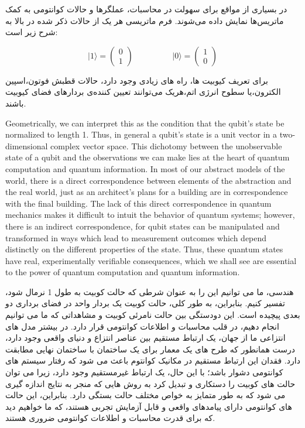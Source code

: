 \documentclass{book}
\begin{document}
در بسیاری از مواقع برای سهولت در محاسبات، عملگر‌ها و حالات کوانتومی به کمک ماتریس‌ها نمایش داده ‌می‌شوند. فرم ماتریسی هر یک از حالات ذکر شده در بالا به شرح زیر است:

\begin{equation}
	\vert 1 \rangle = \begin{pmatrix} 0 \\ 1 \end{pmatrix}
	\hspace{2cm}
	\vert 0 \rangle = \begin{pmatrix} 1 \\ 0 \end{pmatrix}	
\end{equation}

برای تعریف کیوبیت ها، راه های زیادی وجود دارد، حالات قطبش فوتون،‌اسپین الکترون،‌یا سطوح انرژی اتم،‌هریک می‌توانند تعیین کننده‌ی بردار‌های فضای کیوبیت باشند.




Geometrically, we can interpret
this as the condition that the qubit’s state be normalized to length 1. Thus, in general a
qubit’s state is a unit vector in a two-dimensional complex vector space.
This dichotomy between the unobservable state of a qubit and the observations we
can make lies at the heart of quantum computation and quantum information. In most
of our abstract models of the world, there is a direct correspondence between elements
of the abstraction and the real world, just as an architect’s plans for a building are in
correspondence with the final building. The lack of this direct correspondence in quantum
mechanics makes it difficult to intuit the behavior of quantum systems; however, there
is an indirect correspondence, for qubit states can be manipulated and transformed in
ways which lead to measurement outcomes which depend distinctly on the different
properties of the state. Thus, these quantum states have real, experimentally verifiable
consequences, which we shall see are essential to the power of quantum computation and
quantum information.

هندسی، ما می توانیم این را به عنوان شرطی که حالت کوبیت به طول 1 نرمال شود، تفسیر کنیم. بنابراین، به طور کلی، حالت کوبیت یک بردار واحد در فضای برداری دو بعدی پیچیده است.
این دودستگی بین حالت نامرئی کوبیت و مشاهداتی که ما می توانیم انجام دهیم، در قلب محاسبات و اطلاعات کوانتومی قرار دارد. در بیشتر مدل های انتزاعی ما از جهان، یک ارتباط مستقیم بین عناصر انتزاع و دنیای واقعی وجود دارد، درست همانطور که طرح های یک معمار برای یک ساختمان با ساختمان نهایی مطابقت دارد. فقدان این ارتباط مستقیم در مکانیک کوانتوم باعث می شود که رفتار سیستم های کوانتومی دشوار باشد؛ با این حال، یک ارتباط غیرمستقیم وجود دارد، زیرا می توان حالت های کوبیت را دستکاری و تبدیل کرد به روش هایی که منجر به نتایج اندازه گیری می شود که به طور متمایز به خواص مختلف حالت بستگی دارد. بنابراین، این حالت های کوانتومی دارای پیامدهای واقعی و قابل آزمایش تجربی هستند، که ما خواهیم دید که برای قدرت محاسبات و اطلاعات کوانتومی ضروری هستند.
\end{document}
